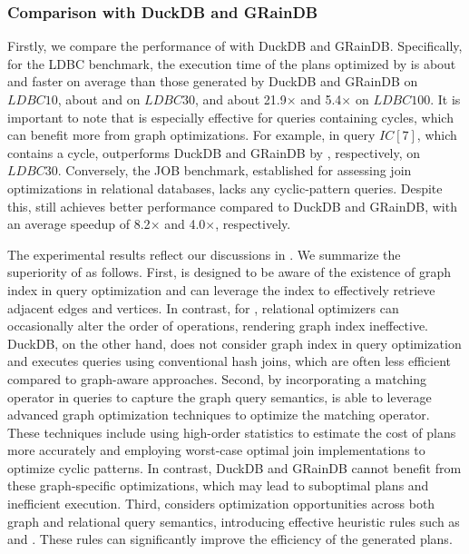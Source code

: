 \subsubsection{Comparison with DuckDB and GRainDB}

Firstly, we compare the performance of \name with DuckDB and GRainDB.
Specifically, for the LDBC benchmark, the execution time of the plans optimized by \name is about  and  faster on average than those generated by DuckDB and GRainDB on $LDBC10$, about  and  on $LDBC30$, and about 21.9$\times$ and 5.4$\times$ on $LDBC100$.
It is important to note that \name is especially effective for queries containing cycles, which can benefit more from graph optimizations. For example, in query $IC[7]$, which contains a cycle, \name outperforms DuckDB and GRainDB by , respectively, on $LDBC30$.
Conversely, the JOB benchmark, established for assessing join optimizations in relational databases, lacks any cyclic-pattern queries. Despite this, \name still achieves better performance compared to DuckDB and GRainDB, with an average speedup of 8.2$\times$ and 4.0$\times$, respectively.

The experimental results reflect our discussions in . We summarize the superiority of \name as follows.
First, \name is designed to be aware of the existence of graph index in query optimization and can leverage the index to effectively retrieve adjacent edges and vertices. In contrast, for , relational optimizers can occasionally alter the order of \EVjoin operations, rendering graph index ineffective. DuckDB, on the other hand, does not consider graph index in query optimization and executes queries using conventional hash joins, which are often less efficient compared to graph-aware approaches.
Second, by incorporating a matching operator in \spjm queries to capture the graph query semantics, \name is able to leverage advanced graph optimization techniques to optimize the matching operator. These techniques include using high-order statistics to estimate the cost of plans more accurately and employing worst-case optimal join implementations to optimize cyclic patterns. In contrast, DuckDB and GRainDB cannot benefit from these graph-specific optimizations, which may lead to suboptimal plans and inefficient execution.
Third, \name considers optimization opportunities across both graph and relational query semantics, introducing effective heuristic rules such as \filterrule and \joinfuserule. These rules can significantly improve the efficiency of the generated plans.


